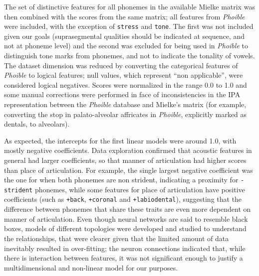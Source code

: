 \documentclass[a4paper]{article}
\begin{document}
The set of distinctive features for all phonemes in the available Mielke
matrix was then combined with the scores from the same matrix; all
features from \emph{Phoible} were included, with the exception of
\texttt{stress} and \texttt{tone}. The first was not included given our
goals (suprasegmental qualities should be indicated at sequence, and not
at phoneme level) and the second was excluded for being used in
\emph{Phoible} to distinguish tone marks from phonemes, and not to
indicate the tonality of vowels. The dataset dimension was reduced by
converting the categorical features of \emph{Phoible} to logical
features; null values, which represent ``non applicable'', were
considered logical negatives. Scores were normalized in the range 0.0 to
1.0 and some manual corrections were performed in face of
inconsistencies in the IPA representation between the \emph{Phoible}
database and Mielke's matrix (for example, converting the stop in
palato-alveolar affricates in \emph{Phoible}, explicitly marked as
dentals, to alveolars).

As expected, the intercepts for the first linear models were around 1.0,
with mostly negative coefficients. Data exploration confirmed that
acoustic features in general had larger coefficients, so that manner of
articulation had higher scores than place of articulation. For example,
the single largest negative coefficient was the one for when both
phonemes are non strident, indicating a proximity for \texttt{-strident}
phonemes, while some features for place of articulation have positive
coefficients (such as \texttt{+back}, \texttt{+coronal} and
\texttt{+labiodental}), suggesting that the difference between phonemes
that share these traits are even more dependent on manner of
articulation. Even though neural networks are said to resemble black
boxes, models of different topologies were developed and studied to
understand the relationships, that were clearer given that the limited
amount of data inevitably resulted in over-fitting; the neuron
connections indicated that, while there is interaction between features,
it was not significant enough to justify a multidimensional and
non-linear model for our purposes.
\end{document}
